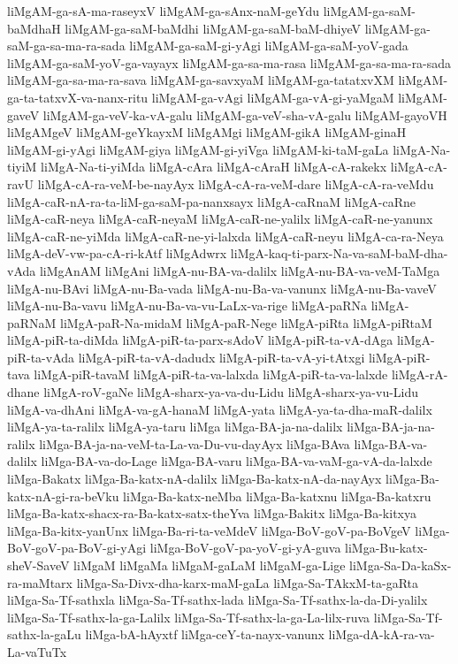 {liMgAM-ga-sA-ma-raseyxV
liMgAM-ga-sAnx-naM-geYdu
liMgAM-ga-saM-baMdhaH
liMgAM-ga-saM-baMdhi
liMgAM-ga-saM-baM-dhiyeV
liMgAM-ga-saM-ga-sa-ma-ra-sada
liMgAM-ga-saM-gi-yAgi
liMgAM-ga-saM-yoV-gada
liMgAM-ga-saM-yoV-ga-vayayx
liMgAM-ga-sa-ma-rasa
liMgAM-ga-sa-ma-ra-sada
liMgAM-ga-sa-ma-ra-sava
liMgAM-ga-savxyaM
liMgAM-ga-tatatxvXM
liMgAM-ga-ta-tatxvX-va-nanx-ritu
liMgAM-ga-vAgi
liMgAM-ga-vA-gi-yaMgaM
liMgAM-gaveV
liMgAM-ga-veV-ka-vA-galu
liMgAM-ga-veV-sha-vA-galu
liMgAM-gayoVH
liMgAMgeV
liMgAM-geYkayxM
liMgAMgi
liMgAM-gikA
liMgAM-ginaH
liMgAM-gi-yAgi
liMgAM-giya
liMgAM-gi-yiVga
liMgAM-ki-taM-gaLa
liMgA-Na-tiyiM
liMgA-Na-ti-yiMda
liMgA-cAra
liMgA-cAraH
liMgA-cA-rakekx
liMgA-cA-ravU
liMgA-cA-ra-veM-be-nayAyx
liMgA-cA-ra-veM-dare
liMgA-cA-ra-veMdu
liMgA-caR-nA-ra-ta-liM-ga-saM-pa-nanxsayx
liMgA-caRnaM
liMgA-caRne
liMgA-caR-neya
liMgA-caR-neyaM
liMgA-caR-ne-yalilx
liMgA-caR-ne-yanunx
liMgA-caR-ne-yiMda
liMgA-caR-ne-yi-lalxda
liMgA-caR-neyu
liMgA-ca-ra-Neya
liMgA-deV-vw-pa-cA-ri-kAtf
liMgAdwrx
liMgA-kaq-ti-parx-Na-va-saM-baM-dha-vAda
liMgAnAM
liMgAni
liMgA-nu-BA-va-dalilx
liMgA-nu-BA-va-veM-TaMga
liMgA-nu-BAvi
liMgA-nu-Ba-vada
liMgA-nu-Ba-va-vanunx
liMgA-nu-Ba-vaveV
liMgA-nu-Ba-vavu
liMgA-nu-Ba-va-vu-LaLx-va-rige
liMgA-paRNa
liMgA-paRNaM
liMgA-paR-Na-midaM
liMgA-paR-Nege
liMgA-piRta
liMgA-piRtaM
liMgA-piR-ta-diMda
liMgA-piR-ta-parx-sAdoV
liMgA-piR-ta-vA-dAga
liMgA-piR-ta-vAda
liMgA-piR-ta-vA-dadudx
liMgA-piR-ta-vA-yi-tAtxgi
liMgA-piR-tava
liMgA-piR-tavaM
liMgA-piR-ta-va-lalxda
liMgA-piR-ta-va-lalxde
liMgA-rA-dhane
liMgA-roV-gaNe
liMgA-sharx-ya-va-du-Lidu
liMgA-sharx-ya-vu-Lidu
liMgA-va-dhAni
liMgA-va-gA-hanaM
liMgA-yata
liMgA-ya-ta-dha-maR-dalilx
liMgA-ya-ta-ralilx
liMgA-ya-taru
liMga
liMga-BA-ja-na-dalilx
liMga-BA-ja-na-ralilx
liMga-BA-ja-na-veM-ta-La-va-Du-vu-dayAyx
liMga-BAva
liMga-BA-va-dalilx
liMga-BA-va-do-Lage
liMga-BA-varu
liMga-BA-va-vaM-ga-vA-da-lalxde
liMga-Bakatx
liMga-Ba-katx-nA-dalilx
liMga-Ba-katx-nA-da-nayAyx
liMga-Ba-katx-nA-gi-ra-beVku
liMga-Ba-katx-neMba
liMga-Ba-katxnu
liMga-Ba-katxru
liMga-Ba-katx-shacx-ra-Ba-katx-satx-theYva
liMga-Bakitx
liMga-Ba-kitxya
liMga-Ba-kitx-yanUnx
liMga-Ba-ri-ta-veMdeV
liMga-BoV-goV-pa-BoVgeV
liMga-BoV-goV-pa-BoV-gi-yAgi
liMga-BoV-goV-pa-yoV-gi-yA-guva
liMga-Bu-katx-sheV-SaveV
liMgaM
liMgaMa
liMgaM-gaLaM
liMgaM-ga-Lige
liMga-Sa-Da-kaSx-ra-maMtarx
liMga-Sa-Divx-dha-karx-maM-gaLa
liMga-Sa-TAkxM-ta-gaRta
liMga-Sa-Tf-sathxla
liMga-Sa-Tf-sathx-lada
liMga-Sa-Tf-sathx-la-da-Di-yalilx
liMga-Sa-Tf-sathx-la-ga-Lalilx
liMga-Sa-Tf-sathx-la-ga-La-lilx-ruva
liMga-Sa-Tf-sathx-la-gaLu
liMga-bA-hAyxtf
liMga-ceY-ta-nayx-vanunx
liMga-dA-kA-ra-va-La-vaTuTx
}
